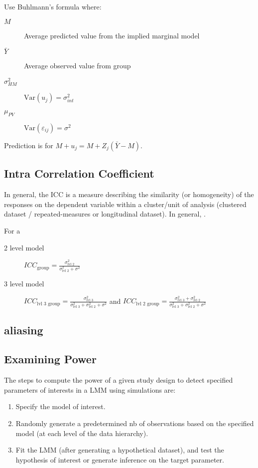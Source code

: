 \documentclass[english]{article}
\begin{document}
\begin{multicols*}{2}
Use Buhlmann's formula where:
\begin{description}
	\item[$M$]	Average predicted value from the implied marginal model
	\item[$\bar{Y}$]	Average observed value from group
	\item[$\sigma^{2}_{HM}$]	$\text{Var}(u_{j}) = \sigma^{2}_{int}$
	\item[$\mu_{PV}$]	$\text{Var}(\varepsilon_{ij}) = \sigma^{2}$
\end{description}
Prediction is for $M + u_{j} = M + Z_{j} (\bar{Y} - M)$.


\subsection{Intra Correlation Coefficient}
In general, the ICC is a measure describing the similarity (or homogeneity) of the responses on the dependent variable within a cluster/unit of analysis (clustered dataset / repeated-measures or longitudinal dataset). In general, .

For a 
\begin{description}
	\item[2 level model]	$ICC_{\text{group}} = \frac{\sigma^{2}_{\text{lvl 2}}}{\sigma^{2}_{\text{lvl 2}} + \sigma^{2}}$
	\item[3 level model]	$ICC_{\text{lvl 3 group}} = \frac{\sigma^{2}_{\text{lvl 3}}}{\sigma^{2}_{\text{lvl 3}} + \sigma^{2}_{\text{lvl 2}} + \sigma^{2}}$ and $ICC_{\text{lvl 2 group}} = \frac{\sigma^{2}_{\text{lvl 3}} + \sigma^{2}_{\text{lvl 2}}}{\sigma^{2}_{\text{lvl 3}} + \sigma^{2}_{\text{lvl 2}} + \sigma^{2}}$
\end{description}

\subsection{aliasing}


\subsection{Examining Power}
The steps to compute the power of a given study design to detect specified parameters of interests in a LMM using simulations are:
\begin{enumerate}
	\item	Specify the model of interest.
	\item	Randomly generate a predetermined nb of observations based on the specified model (at each level of the data hierarchy).
	\item	Fit the LMM (after generating a hypothetical dataset), and test the hypothesis of interest or generate inference on the target parameter.
\end{enumerate}


\end{multicols*}
\end{document}
